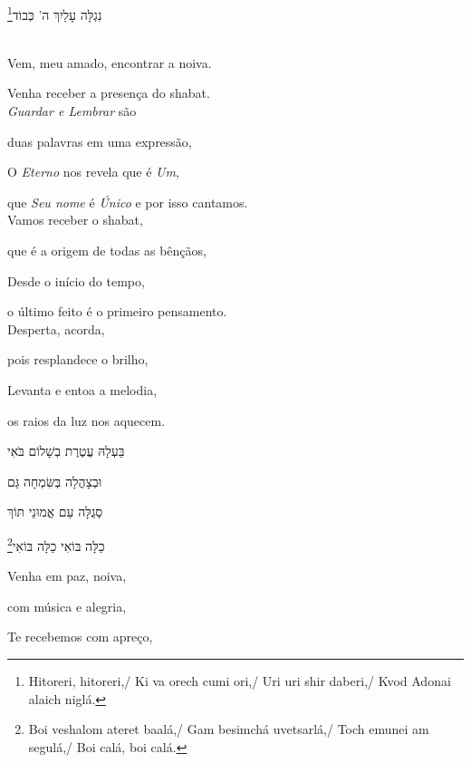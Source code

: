 נִגְלָּה עָלַיִךְ ה' כְּבוֹד\footnote{Hitoreri, hitoreri,/ Ki va orech cumi ori,/ Uri uri shir daberi,/
Kvod Adonai alaich niglá.}\\[10pt]

\movetooddpage
\raggedright

\vspace*{1cm}

\textsc{}\\[15pt]

Vem, meu amado, encontrar a noiva.

Venha receber a presença do shabat.\\[10pt]

\emph{Guardar e Lembrar} são

duas palavras em uma expressão,

O \emph{Eterno} nos revela que é \emph{Um},

que \emph{Seu nome} é \emph{Único} e por isso cantamos.\\[10pt]

Vamos receber o shabat,

que é a origem de todas as bênçãos,

Desde o início do tempo,

o último feito é o primeiro pensamento.\\[10pt]

Desperta, acorda,

pois resplandece o brilho,

Levanta e entoa a melodia,

os raios da luz nos aquecem.\\[10pt]

\movetoevenpage
\raggedleft

\vspace*{1cm}

בַּעְלָהּ עֲטֶרֶת בְשָׁלוֹם בֹּאִי

וּבְצָהֳלָה בְּשִּׂמְחָה גַּם 

סְגֻלָּה עַם אֱמוּנֵי תּוֹךְ 

כַלָּה בּוֹאִי כַלָּה בּוֹאִי\footnote{
Boi veshalom ateret baalá,/ Gam besimchá uvetsarlá,/
Toch emunei am segulá,/ Boi calá, boi calá.}


\movetooddpage
\raggedright

\vspace*{1cm}

Venha em paz, noiva,

com música e alegria,

Te recebemos com apreço,

